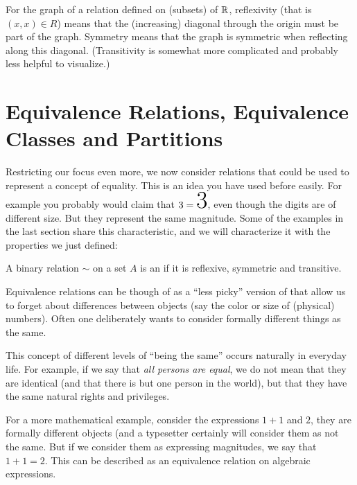 For the graph of a relation defined on (subsets) of ${\mathbb R}$, reflexivity (that is $(x,x)\in
R$) means that the (increasing) diagonal through the origin must be part of the graph.
Symmetry means that the graph is symmetric when reflecting along this diagonal.
(Transitivity is somewhat more complicated and probably less helpful to visualize.)

\section{Equivalence Relations, Equivalence Classes and Partitions}
\label{secequiv}

Restricting our focus even more,
we now consider relations that could be used to represent a concept of
equality. This is an idea
you have used before easily. For example you probably would
claim that $3=\mbox{\Huge 3}$, even though the digits are of different
size. But they represent the same magnitude. Some of the examples in the
last section share this characteristic, and we will characterize it with the
properties we just defined:
\begin{defn}
A binary relation $\sim$ on a set $A$ is an  if
it is reflexive, symmetric and transitive.
\end{defn}
Equivalence relations can be though of as a ``less picky'' version of
 that allow us to forget about differences between objects (say the
color or size  of (physical) numbers). Often one deliberately wants to
consider formally different things as the same. 

This concept of different levels of ``being the same'' occurs naturally in
everyday life. For example, if we say that {\em all persons are equal}, we do not
mean that they are identical (and that there is but one person in the world), but
that they have the same natural rights and privileges.

For a more mathematical example, consider the expressions $1+1$ and $2$, they are formally
different objects (and a typesetter certainly will consider them as not
the same. But if we consider them as expressing magnitudes, we say that
$1+1=2$.
This can be described as an equivalence relation on algebraic expressions.
\medskip

